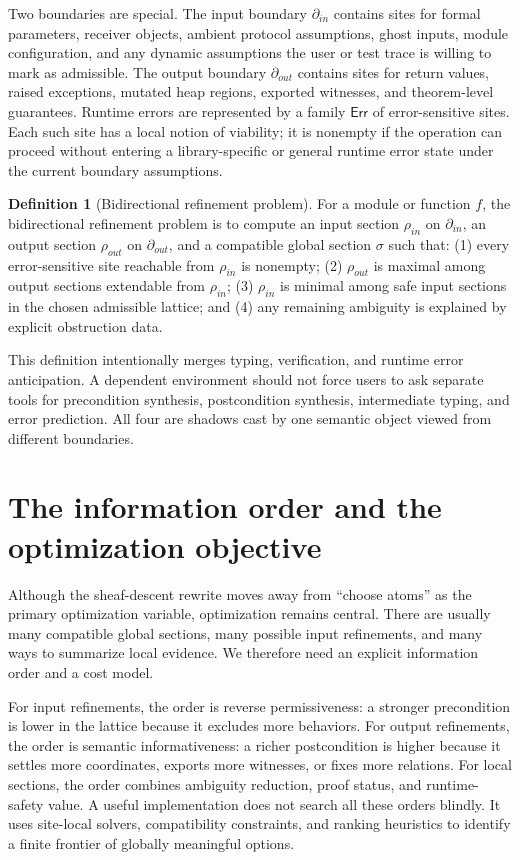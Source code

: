 \documentclass[11pt]{report}
\newcommand{\ErrorSet}{\ensuremath{\mathsf{Err}}}
\theoremstyle{definition}
\newtheorem{definition}{Definition}[section]
\theoremstyle{plain}
\begin{document}
Two boundaries are special. The input boundary $\partial_{in}$ contains sites for
formal parameters, receiver objects, ambient protocol assumptions, ghost inputs,
module configuration, and any dynamic assumptions the user or test trace is
willing to mark as admissible. The output boundary $\partial_{out}$ contains
sites for return values, raised exceptions, mutated heap regions, exported
witnesses, and theorem-level guarantees. Runtime errors are represented by a
family $\ErrorSet$ of error-sensitive sites. Each such site has a local notion of
viability; it is nonempty if the operation can proceed without entering a
library-specific or general runtime error state under the current boundary
assumptions.

\begin{definition}[Bidirectional refinement problem]
For a module or function $f$, the bidirectional refinement problem is to compute
an input section $\rho_{in}$ on $\partial_{in}$, an output section
$\rho_{out}$ on $\partial_{out}$, and a compatible global section $\sigma$ such
that: (1) every error-sensitive site reachable from $\rho_{in}$ is nonempty;
(2) $\rho_{out}$ is maximal among output sections extendable from $\rho_{in}$;
(3) $\rho_{in}$ is minimal among safe input sections in the chosen admissible
lattice; and (4) any remaining ambiguity is explained by explicit obstruction
data.
\end{definition}

This definition intentionally merges typing, verification, and runtime error
anticipation. A dependent environment should not force users to ask separate
tools for precondition synthesis, postcondition synthesis, intermediate typing,
and error prediction. All four are shadows cast by one semantic object viewed
from different boundaries.


\section{The information order and the optimization objective}

Although the sheaf-descent rewrite moves away from ``choose atoms'' as the
primary optimization variable, optimization remains central. There are usually
many compatible global sections, many possible input refinements, and many ways
to summarize local evidence. We therefore need an explicit information order and
a cost model.

For input refinements, the order is reverse permissiveness: a stronger
precondition is lower in the lattice because it excludes more behaviors. For
output refinements, the order is semantic informativeness: a richer postcondition
is higher because it settles more coordinates, exports more witnesses, or fixes
more relations. For local sections, the order combines ambiguity reduction,
proof status, and runtime-safety value. A useful implementation does not search
all these orders blindly. It uses site-local solvers, compatibility constraints,
and ranking heuristics to identify a finite frontier of globally meaningful
options.
\end{document}
